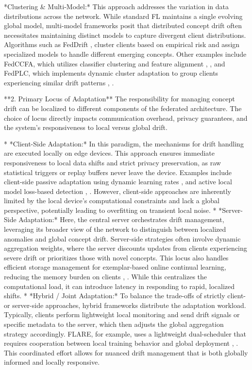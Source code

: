 \documentclass[journal]{IEEEtran}
\begin{document}
*Clustering \& Multi-Model:* This approach addresses the variation in data distributions across the network. While standard FL maintains a single evolving global model, multi-model frameworks posit that distributed concept drift often necessitates maintaining distinct models to capture divergent client distributions. Algorithms such as FedDrift \cite{Jothimurugesan2022}, \cite{Jothimurugesan2022a} cluster clients based on empirical risk and assign specialized models to handle different emerging concepts. Other examples include FedCCFA, which utilizes classifier clustering and feature alignment \cite{Chen2024}, \cite{Chen2024a}, and FedPLC, which implements dynamic cluster adaptation to group clients experiencing similar drift patterns \cite{Zhou2026}, \cite{Zhou2026a}.

**2. Primary Locus of Adaptation**
The responsibility for managing concept drift can be localized to different components of the federated architecture. The choice of locus directly impacts communication overhead, privacy guarantees, and the system's responsiveness to local versus global drift.

*   *Client-Side Adaptation:* In this paradigm, the mechanisms for drift handling are executed locally on edge devices. This approach ensures immediate responsiveness to local data shifts and strict privacy preservation, as raw statistical triggers or replay buffers never leave the device. Examples include client-side passive adaptation using dynamic learning rates \cite{Saile2024a}, \cite{Saile2024} and active local model loss-based detection \cite{Rahman2025}, \cite{Rahman2025a}. However, client-side approaches are inherently limited by the local device's computational constraints and lack a global perspective, potentially leading to overfitting on transient local noise.
*   *Server-Side Adaptation:* Here, the central server orchestrates drift management, leveraging its broader view of the network to distinguish between localized anomalies and global concept drift. Server-side strategies often involve dynamic aggregation weights, where the server discounts updates from clients experiencing severe drift or prioritizes those with novel concepts. This locus also handles efficient storage management for exemplar-based online continual learning, reducing the memory burden on clients \cite{Zhou2024}, \cite{paper62}. While this centralizes the computational load, it can introduce latency in responding to rapid, localized shifts.
*   *Hybrid / Joint Adaptation:* To balance the trade-offs of strictly client- or server-side approaches, hybrid frameworks distribute the adaptation workload. Typically, clients perform lightweight local monitoring and send drift signals or specific metadata to the server, which then adjusts the global aggregation strategy accordingly. FLARE, for example, uses a lightweight dual-scheduler that requires cooperation between local training behavior and global deployment \cite{Chow2023}, \cite{Hinder2024}. This coordinated effort allows for nuanced drift management that is both globally informed and locally responsive.
\end{document}
